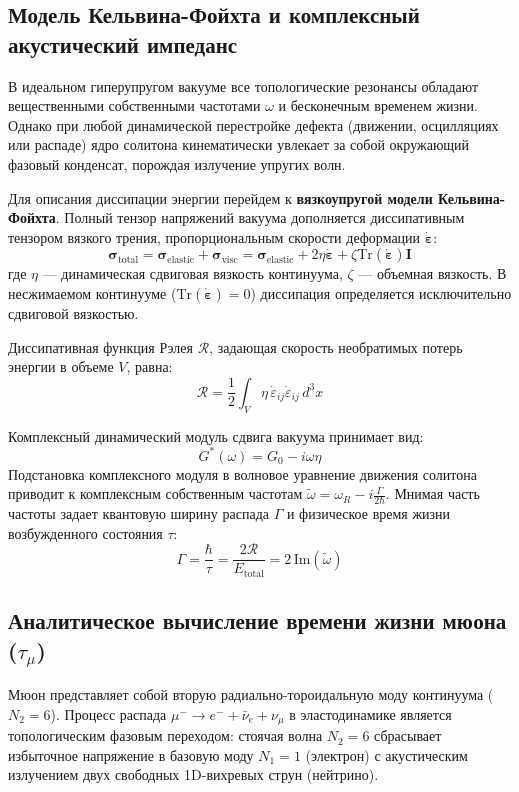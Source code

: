 \documentclass[12pt,a4paper]{article}
\begin{document}
\subsection{Модель Кельвина-Фойхта и комплексный акустический импеданс}
В идеальном гиперупругом вакууме все топологические резонансы обладают вещественными собственными частотами $\omega$ и бесконечным временем жизни. Однако при любой динамической перестройке дефекта (движении, осцилляциях или распаде) ядро солитона кинематически увлекает за собой окружающий фазовый конденсат, порождая излучение упругих волн.

Для описания диссипации энергии перейдем к \textbf{вязкоупругой модели Кельвина-Фойхта}. Полный тензор напряжений вакуума дополняется диссипативным тензором вязкого трения, пропорциональным скорости деформации $\dot{\boldsymbol{\varepsilon}}$:
\begin{equation}
	\boldsymbol{\sigma}_{\text{total}} = \boldsymbol{\sigma}_{\text{elastic}} + \boldsymbol{\sigma}_{\text{visc}} = \boldsymbol{\sigma}_{\text{elastic}} + 2\eta \dot{\boldsymbol{\varepsilon}} + \zeta \text{Tr}(\dot{\boldsymbol{\varepsilon}}) \mathbf{I}
\end{equation}
где $\eta$ — динамическая сдвиговая вязкость континуума, $\zeta$ — объемная вязкость. В несжимаемом континууме ($\text{Tr}(\dot{\boldsymbol{\varepsilon}}) = 0$) диссипация определяется исключительно сдвиговой вязкостью.

Диссипативная функция Рэлея $\mathcal{R}$, задающая скорость необратимых потерь энергии в объеме $V$, равна:
\begin{equation}
	\mathcal{R} = \frac{1}{2} \int_V \eta \, \dot{\varepsilon}_{ij} \dot{\varepsilon}_{ij} \, d^3x
\end{equation}

Комплексный динамический модуль сдвига вакуума принимает вид:
\begin{equation}
	G^*(\omega) = G_0 - i \omega \eta
\end{equation}
Подстановка комплексного модуля в волновое уравнение движения солитона приводит к комплексным собственным частотам $\tilde{\omega} = \omega_R - i \frac{\Gamma}{2\hbar}$. Мнимая часть частоты задает квантовую ширину распада $\Gamma$ и физическое время жизни возбужденного состояния $\tau$:
\begin{equation}
	\Gamma = \frac{\hbar}{\tau} = \frac{2 \mathcal{R}}{E_{\text{total}}} = 2 \, \text{Im}(\tilde{\omega})
\end{equation}

\subsection{Аналитическое вычисление времени жизни мюона ($\tau_\mu$)}
Мюон представляет собой вторую радиально-тороидальную моду континуума ($N_2=6$). Процесс распада $\mu^- \to e^- + \bar{\nu}_e + \nu_\mu$ в эластодинамике является топологическим фазовым переходом: стоячая волна $N_2=6$ сбрасывает избыточное напряжение в базовую моду $N_1=1$ (электрон) с акустическим излучением двух свободных 1D-вихревых струн (нейтрино).
\end{document}
